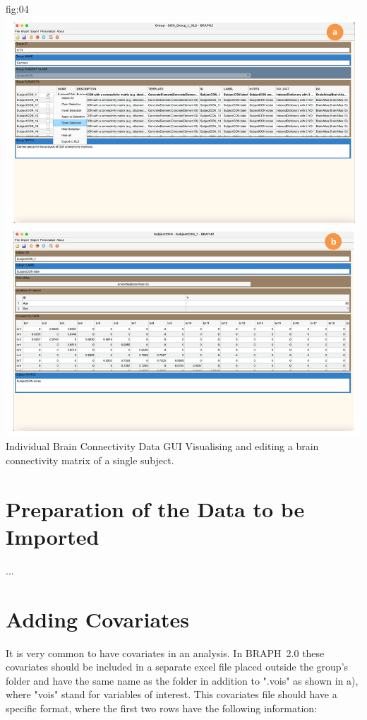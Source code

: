 \documentclass[justified]{tufte-handout}
\begin{document}
	{fig:04}
	{\includegraphics{fig04.png}
	}
	{Individual Brain Connectivity Data GUI}
	{
	Visualising and editing a brain connectivity matrix of a single subject. 
	}

\section{Preparation of the Data to be Imported}

...

\section{Adding Covariates}

It is very common to have covariates in an analysis. In BRAPH~2.0 these covariates should be included in a separate excel file placed outside the group's folder and have the same name as the folder in addition to ".vois" as shown in a), where "vois" stand for variables of interest. This covariates file should have a specific format, where the first two rows have the following information:
\end{document}
